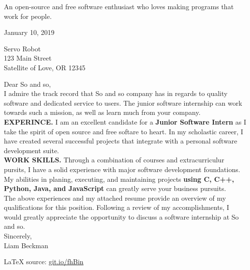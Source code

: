 

\usepackage[margin=1.5cm, top=1.5cm, bottom=1.5cm]{geometry}



\maketitle

\begin{center}
An open-source and free software enthusiast who loves making programs that work for people.
\end{center}

\textcolor{my-grey}{\dotfill}
\bigbreak

January 10, 2019\\
\bigbreak

Servo Robot\\
123 Main Street\\
Satellite of Love, OR 12345\\

\bigbreak

Dear So and so,\\

I admire the track record that So and so company has in regards to quality software and dedicated service to users. The junior software internship can work towards such a mission, as well as learn much from your company.\\

\textbf{EXPERINCE.} I am an excellent candidate for a \textbf{Junior Software Intern} as I take the spirit of open source and free softare to heart. In my scholastic career, I have created several successful projects that integrate with a personal software development suite.\\

\textbf{WORK SKILLS.} Through a combination of courses and extracurriculur pursits, I have a solid experience with major software development foundations. My abilities in planing, executing, and maintaining projects \textbf{using C, C++, Python, Java, and JavaScript} can greatly serve your business pursuits.\\

The above experiences and my attached resume provide an overview of my qualifications for this position. Following a review of my accomplishments, I would greatly appreciate the opportunity to discuss a software internship at So and so.\\

Sincerely,\\

Liam Beckman

\vfill

\textcolor{my-grey}{\dotfill}
\medbreak
\hfill\textcolor{my-red}{\LaTeX{} source: \href{https://git.io/fhBin}{git.io/fhBin}}



